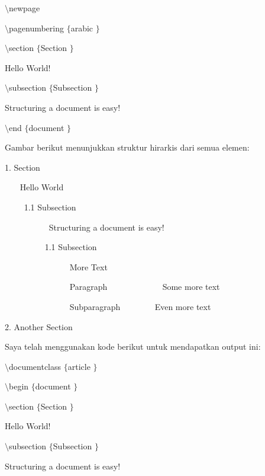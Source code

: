  $  \setminus  $newpage
 \par
 $  \setminus  $pagenumbering $  \{  $arabic $  \}  $
 \par
\vspace{12pt}
 $  \setminus  $section $  \{  $Section $  \}  $
 \par
\vspace{12pt}
Hello World!
 \par
\vspace{12pt}
 $  \setminus  $subsection $  \{  $Subsection $  \}  $
 \par
\vspace{12pt}
Structuring a document is easy!
 \par
\vspace{12pt}
 $  \setminus  $end $  \{  $document $  \}  $
 \par
\vspace{14pt}
Gambar berikut menunjukkan struktur hirarkis dari semua elemen:
 \par
1. Section
 \par
~~~ Hello World
 \par
~~~~ 1.1 Subsection
 \par
~~~~~~~~~~ Structuring a document is easy!
 \par
~~~~~~~~~ 1.1 Subsection
 \par
~~~~~~~~~~~~~~~ More Text
 \par
~~~~~~~~~~~~~~~ Paragraph ~~~~~~~~~~~~ Some more text
 \par
~~~~~~~~~~~~~~~ Subparagraph ~~~~~~~ Even more text \par
2. Another Section
 \par
\hspace{0.50in} Saya telah menggunakan kode berikut untuk mendapatkan output ini:
 \par
 $  \setminus  $documentclass $  \{  $article $  \}  $
 \par
\vspace{12pt}
 $  \setminus  $begin $  \{  $document $  \}  $
 \par
\vspace{12pt}
 $  \setminus  $section $  \{  $Section $  \}  $
 \par
\vspace{12pt}
Hello World!
 \par
\vspace{12pt}
 $  \setminus  $subsection $  \{  $Subsection $  \}  $
 \par
\vspace{12pt}
Structuring a document is easy!
